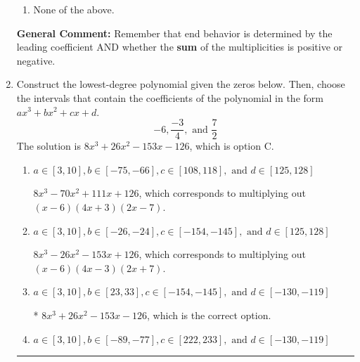 \documentclass{extbook}[14pt]
\newcommand{\litem}[1]{\item #1

\rule{\textwidth}{0.4pt}}
\begin{document}
\begin{enumerate}
{\begin{enumerate}[label=\Alph*.]
\item None of the above.\end{enumerate}
\textbf{General Comment:} Remember that end behavior is determined by the leading coefficient AND whether the \textbf{sum} of the multiplicities is positive or negative.
}
\litem{
Construct the lowest-degree polynomial given the zeros below. Then, choose the intervals that contain the coefficients of the polynomial in the form $ax^3+bx^2+cx+d$.
\[ -6, \frac{-3}{4}, \text{ and } \frac{7}{2} \]The solution is \( 8x^{3} +26 x^{2} -153 x -126 \), which is option C.\begin{enumerate}[label=\Alph*.]
\item \( a \in [3, 10], b \in [-75, -66], c \in [108, 118], \text{ and } d \in [125, 128] \)

$8x^{3} -70 x^{2} +111 x + 126$, which corresponds to multiplying out $(x -6)(4x + 3)(2x -7)$.
\item \( a \in [3, 10], b \in [-26, -24], c \in [-154, -145], \text{ and } d \in [125, 128] \)

$8x^{3} -26 x^{2} -153 x + 126$, which corresponds to multiplying out $(x -6)(4x -3)(2x + 7)$.
\item \( a \in [3, 10], b \in [23, 33], c \in [-154, -145], \text{ and } d \in [-130, -119] \)

* $8x^{3} +26 x^{2} -153 x -126$, which is the correct option.
\item \( a \in [3, 10], b \in [-89, -77], c \in [222, 233], \text{ and } d \in [-130, -119] \)


\end{enumerate}}
\end{enumerate}
\end{document}
